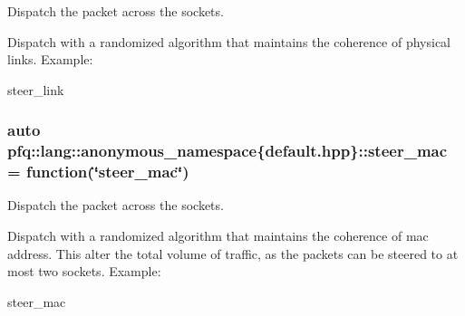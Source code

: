 Dispatch the packet across the sockets. 

Dispatch with a randomized algorithm that maintains the coherence of physical links. Example\+:

steer\+\_\+link 
\subsubsection[{\texorpdfstring{steer\+\_\+mac}{steer_mac}}]{\setlength{\rightskip}{0pt plus 5cm}auto pfq\+::lang\+::anonymous\+\_\+namespace\{default.\+hpp\}\+::steer\+\_\+mac = {\bf function}(\char`\"{}steer\+\_\+mac\char`\"{})}\hypertarget{namespacepfq_1_1lang_1_1anonymous__namespace_02default_8hpp_03_ad51e91e3b485c729ac1ba39a46e337a0}{}\label{namespacepfq_1_1lang_1_1anonymous__namespace_02default_8hpp_03_ad51e91e3b485c729ac1ba39a46e337a0}


Dispatch the packet across the sockets. 

Dispatch with a randomized algorithm that maintains the coherence of mac address. This alter the total volume of traffic, as the packets can be steered to at most two sockets. Example\+:

steer\+\_\+mac 
